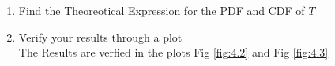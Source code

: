 \documentclass[journal,12pt,twocolumn]{IEEEtran}
\renewcommand\thesection{\arabic{section}}
\begin{document}
\begin{enumerate}[label=\thesection.\arabic*
,ref=\thesection.\theenumi]
\item Find the Theoreotical Expression for the PDF and CDF of $T$\\
\solution
    
\item Verify your results through a plot \\
\solution The Results are verfied in the plots
Fig \ref{fig:4.2} and Fig \ref{fig:4.3}
\end{enumerate}
\end{document}
